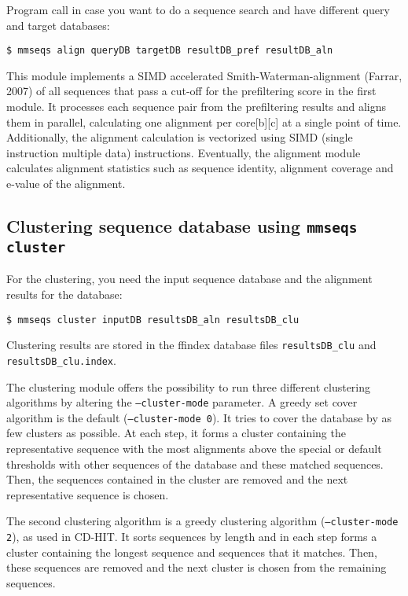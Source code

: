 \documentclass[11pt,a4paper]{scrreprt}
\begin{document}
Program call in case you want to do a sequence search and have different query and target databases:


\begin{verbatim}
$ mmseqs align queryDB targetDB resultDB_pref resultDB_aln 
\end{verbatim}


This module implements a SIMD accelerated Smith-Waterman-alignment (Farrar, 2007) of all sequences that pass a cut-off for the prefiltering score in the first module. It processes each sequence pair from the prefiltering results and aligns them in parallel, calculating one alignment per core[b][c] at a single point of time. Additionally, the alignment calculation is vectorized using SIMD (single instruction multiple data) instructions. Eventually, the alignment module calculates alignment statistics such as sequence identity, alignment coverage and e-value of the alignment.
\subsection{Clustering sequence database using \texttt{mmseqs cluster}} \label{sub:Clustering_module}
For the clustering, you need the input sequence database and the alignment results for the database:


\begin{verbatim}
$ mmseqs cluster inputDB resultsDB_aln resultsDB_clu
\end{verbatim}


Clustering results are stored in the ffindex database files \texttt{resultsDB\_clu} and \texttt{resultsDB\_clu.index}.


The clustering module offers the possibility to run three different clustering algorithms by altering the \texttt{--cluster-mode} parameter. A greedy set cover algorithm is the default (\texttt{--cluster-mode 0}). It tries to cover the database by as few clusters as possible. At each step, it forms a cluster containing the representative sequence with the most alignments above the special or default thresholds with other sequences of the database and these matched sequences. Then, the sequences contained in the cluster are removed and the next representative sequence is chosen.


The second clustering algorithm is a greedy clustering algorithm (\texttt{--cluster-mode 2}), as used in CD-HIT. It sorts sequences by length and in each step forms a cluster containing the longest sequence and sequences that it matches. Then, these sequences are removed and the next cluster is chosen from the remaining sequences.
\end{document}
